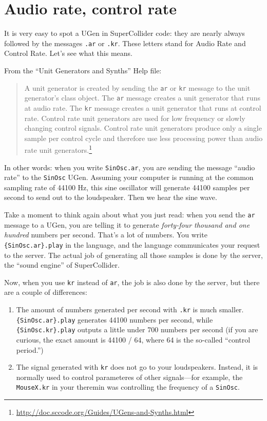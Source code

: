 \section{Audio rate, control rate}

It is very easy to spot a UGen in SuperCollider code: they are nearly always followed by the messages \texttt{.ar} or \texttt{.kr}. These letters stand for Audio Rate and Control Rate. Let's see what this means.

From the ``Unit Generators and Synths'' Help file:

\begin{quotation}
A unit generator is created by sending the \texttt{ar} or \texttt{kr} message to the unit generator's class object. The \texttt{ar} message creates a unit generator that runs at audio rate. The \texttt{kr} message creates a unit generator that runs at control rate. Control rate unit generators are used for low frequency or slowly changing control signals. Control rate unit generators produce only a single sample per control cycle and therefore use less processing power than audio rate unit generators.\footnote{\url{http://doc.sccode.org/Guides/UGens-and-Synths.html}}
\end{quotation}

In other words: when you write \texttt{SinOsc.ar}, you are sending the message ``audio rate'' to the \texttt{SinOsc} UGen. Assuming your computer is running at the common sampling rate of 44100 Hz, this sine oscillator will generate 44100 samples per second to send out to the loudspeaker. Then we hear the sine wave.

Take a moment to think again about what you just read: when you send the \texttt{ar} message to a UGen, you are telling it to generate \emph{forty-four thousand and one hundred} numbers per second. That's a lot of numbers. You write \texttt{\{SinOsc.ar\}.play} in the language, and the language communicates your request to the server. The actual job of generating all those samples is done by the server, the ``sound engine'' of SuperCollider.

Now, when you use \texttt{kr} instead of \texttt{ar}, the job is also done by the server, but there are a couple of differences:
\begin{enumerate}
\item The amount of numbers generated per second with \texttt{.kr} is much smaller.\texttt{\{SinOsc.ar\}.play} generates 44100 numbers per second, while \texttt{\{SinOsc.kr\}.play} outputs a little under 700 numbers per second (if you are curious, the exact amount is 44100 / 64, where 64 is the so-called ``control period.'')
\item The signal generated with \texttt{kr} does not go to your loudspeakers. Instead, it is normally used to control parameteres of other signals---for example, the \texttt{MouseX.kr} in your theremin was controlling the frequency of a \texttt{SinOsc}.

\end{enumerate} 

